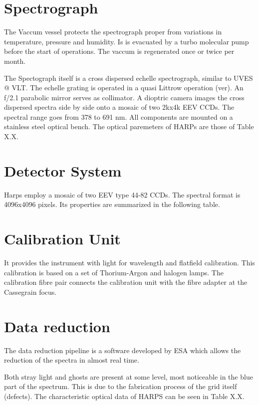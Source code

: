 \documentclass[dvips,12pt,a4paper]{report}
\begin{document}
{{\section{Spectrograph}

The Vaccum vessel protects the spectrograph proper from variations in temperature, pressure and humidity. Is is evacuated by a turbo molecular pump before the start of operations. The vaccum is regenerated once or twice per month. 

The Spectograph itself is a cross dispersed echelle spectrograph, similar to UVES @ VLT. The echelle grating is operated in a quasi Littrow operation (ver). An f/2.1 parabolic mirror serves as collimator. A dioptric camera images the cross dispersed spectra side by side onto a mosaic of two 2kx4k EEV CCDs. The spectral range goes from 378 to 691 nm. All components are mounted on a stainless steel optical bench. The optical paremeters of HARPs are those of Table X.X.

\section{Detector System}

Harps employ a mosaic of two EEV type 44-82 CCDs. The spectral format is 4096x4096 pixels. Its properties are summarized in the following table. 

\section {Calibration Unit}

It provides the instrument with light for wavelength and flatfield calibration. This calibration is based on a set of Thorium-Argon and halogen lamps. The calibration fibre pair connects the calibration unit with the fibre adapter at the Cassegrain focus. 

\section {Data reduction}

The data reduction pipeline is a software developed by ESA which allows the reduction of the spectra in almost real time. 


Both stray light and ghosts are present at some level, most noticeable in the blue part of the spectrum. This is due to the fabrication process of the grid itself (defects). The characteristic optical data of HARPS can be seen in Table X.X.


















}}
\end{document}
